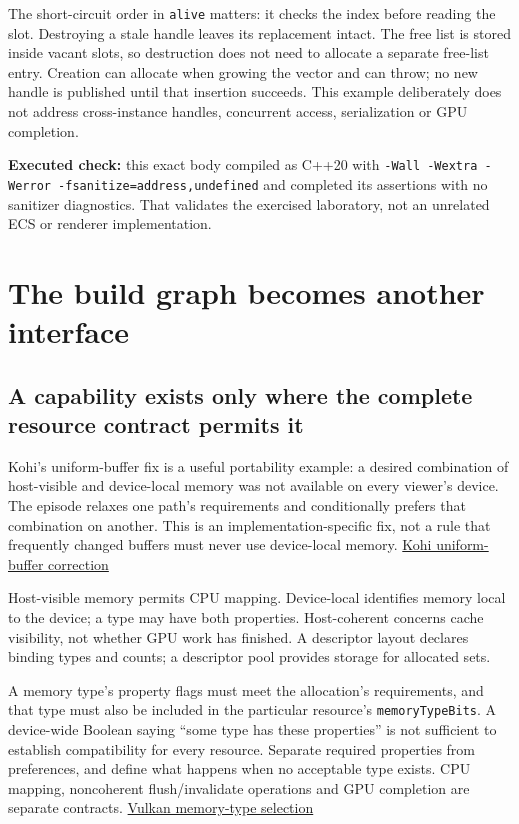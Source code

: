 The short-circuit order in \texttt{alive} matters: it checks the index before reading the slot. Destroying a stale handle leaves its replacement intact. The free list is stored inside vacant slots, so destruction does not need to allocate a separate free-list entry. Creation can allocate when growing the vector and can throw; no new handle is published until that insertion succeeds. This example deliberately does not address cross-instance handles, concurrent access, serialization or GPU completion.

\textbf{Executed check:} this exact body compiled as C++20 with \texttt{-Wall\ -Wextra\ -Werror\ -fsanitize=address,undefined} and completed its assertions with no sanitizer diagnostics. That validates the exercised laboratory, not an unrelated ECS or renderer implementation.

\section{The build graph becomes another interface}\label{05-engine-i-ch008-the-build-graph-becomes-another-interface}

\subsection{A capability exists only where the complete resource contract permits it}\label{05-engine-i-ch008-a-capability-exists-only-where-the-complete-resource-contract-permits-it}

Kohi's uniform-buffer fix is a useful portability example: a desired combination of host-visible and device-local memory was not available on every viewer's device. The episode relaxes one path's requirements and conditionally prefers that combination on another. This is an implementation-specific fix, not a rule that frequently changed buffers must never use device-local memory. \href{https://www.youtube.com/watch?v=aD6fZ7tQSAY}{Kohi uniform-buffer correction}

Host-visible memory permits CPU mapping. Device-local identifies memory local to the device; a type may have both properties. Host-coherent concerns cache visibility, not whether GPU work has finished. A descriptor layout declares binding types and counts; a descriptor pool provides storage for allocated sets.

A memory type's property flags must meet the allocation's requirements, and that type must also be included in the particular resource's \texttt{memoryTypeBits}. A device-wide Boolean saying ``some type has these properties'' is not sufficient to establish compatibility for every resource. Separate required properties from preferences, and define what happens when no acceptable type exists. CPU mapping, noncoherent flush/invalidate operations and GPU completion are separate contracts. \href{https://docs.vulkan.org/spec/latest/chapters/memory.html}{Vulkan memory-type selection}

